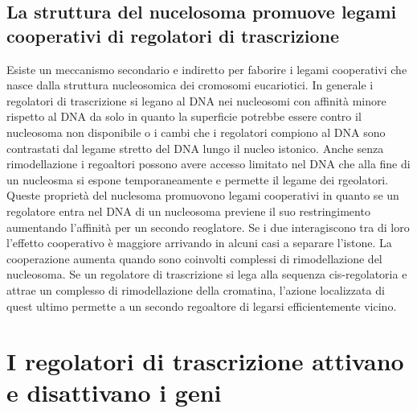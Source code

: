 \subsection{La struttura del nucelosoma promuove legami cooperativi di regolatori di trascrizione}
Esiste un meccanismo secondario e indiretto per faborire i legami cooperativi che nasce dalla struttura nucleosomica dei cromosomi eucariotici. In generale i regolatori di trascrizione
si legano al DNA nei nucleosomi con affinit\`a minore rispetto al DNA da solo in quanto la superficie potrebbe essere contro il nucleosoma non disponibile o i cambi che i regolatori 
compiono al DNA sono contrastati dal legame stretto del DNA lungo il nucleo istonico. Anche senza rimodellazione i regoaltori possono avere accesso limitato nel DNA che alla fine di 
un nucleosma si espone temporaneamente e permette il legame dei rgeolatori. Queste propriet\`a del nuclesoma promuovono legami cooperativi in quanto se un regolatore entra nel DNA di 
un nucleosoma previene il suo restringimento aumentando l'affinit\`a per un secondo reoglatore. Se i due interagiscono tra di loro l'effetto cooperativo \`e maggiore arrivando in 
alcuni casi a separare l'istone. La cooperazione aumenta quando sono coinvolti complessi di rimodellazione del nucleosoma. Se un regolatore di trascrizione si lega alla sequenza 
cis-regolatoria e attrae un complesso di rimodellazione della cromatina, l'azione localizzata di quest ultimo permette a un secondo regoaltore di legarsi efficientemente vicino. 
\section{I regolatori di trascrizione attivano e disattivano i geni}

